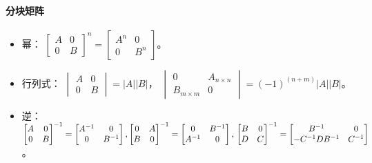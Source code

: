 \documentclass[
12pt, %
a4paper, 
oneside, %
headinclude,footinclude, %
]{scrartcl}
\begin{document}
\paragraph{分块矩阵}
\begin{itemize}
\item 幂：
$ \begin{bmatrix} A & 0 \\ 0 & B \end{bmatrix}^n = \begin{bmatrix} A^n & 0 \\ 0 & B^n \end{bmatrix} $。  
\item 行列式：
$ \begin{vmatrix} A & 0 \\ 0 & B \end{vmatrix} = |A||B| $，
$ \begin{vmatrix} 0 & A_{n \times n} \\ B_{m \times m} & 0 \end{vmatrix} = (-1)^{(n + m)}|A||B| $。
\item 逆：
$
\begin{bmatrix} A & 0 \\ 0 & B \end{bmatrix}^{-1} =
\begin{bmatrix} A^{-1} & 0 \\ 0 & B^{-1} \end{bmatrix},
\begin{bmatrix} 0 & A \\ B & 0 \end{bmatrix}^{-1} =
\begin{bmatrix} 0 & B^{-1} \\ A^{-1} & 0 \end{bmatrix}, \\
\begin{bmatrix} B & 0 \\ D & C \end{bmatrix}^{-1} =
\begin{bmatrix} B^{-1} & 0 \\ -C^{-1}DB^{-1} & C^{-1} \end{bmatrix}
$。
\end{itemize}
\end{document}
